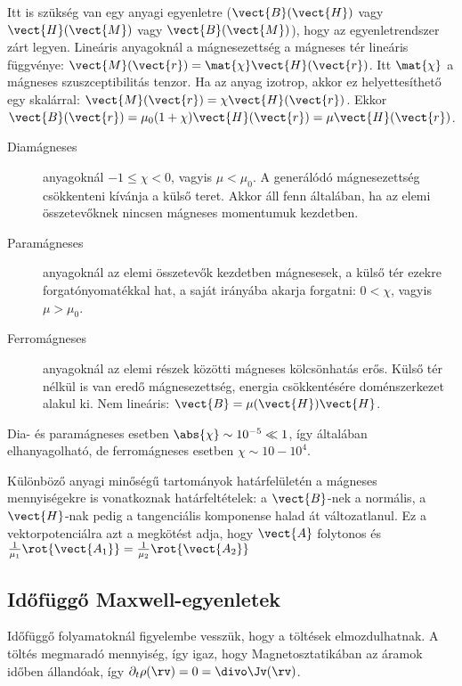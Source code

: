    Itt is szükség van egy anyagi egyenletre ($\vect{B}(\vect{H})$ vagy $\vect{H}(\vect{M})$ vagy $\vect{B}(\vect{M})$), hogy az egyenletrendszer zárt legyen.
   Lineáris anyagoknál a mágnesezettség a mágneses tér lineáris függvénye: $\vect{M}(\vect{r})=\mat{\chi}\vect{H}(\vect{r})$.
   Itt $\mat{\chi}$ a mágneses szuszceptibilitás tenzor.
   Ha az anyag izotrop, akkor ez helyettesíthető egy skalárral: $\vect{M}(\vect{r})=\chi\vect{H}(\vect{r})$.
   Ekkor $\vect{B}(\vect{r})=\mu_0(1+\chi)\vect{H}(\vect{r})=\mu\vect{H}(\vect{r})$. 
   
   \begin{description}
    \item[Diamágneses] anyagoknál $-1\leq\chi<0$, vagyis $\mu<\mu_0$.
   A generálódó mágnesezettség csökkenteni kívánja a külső teret.
   Akkor áll fenn általában, ha az elemi összetevőknek nincsen mágneses momentumuk kezdetben.
    \item[Paramágneses] anyagoknál az elemi összetevők kezdetben mágnesesek, a külső tér ezekre forgatónyomatékkal hat, a saját irányába akarja forgatni: $0<\chi$, vagyis $\mu>\mu_0$. 
    \item[Ferromágneses] anyagoknál az elemi részek közötti mágneses kölcsönhatás erős.
   Külső tér nélkül is van eredő mágnesezettség, energia csökkentésére doménszerkezet alakul ki.
   Nem lineáris: $\vect{B}=\mu(\vect{H})\vect{H}$. 
   \end{description}
   Dia- és paramágneses esetben $\abs{\chi}\sim 10^{-5}\ll 1$, így általában elhanyagolható, de ferromágneses esetben $\chi\sim 10-10^{4}$. 
   
   Különböző anyagi minőségű tartományok határfelületén a mágneses mennyiségekre is vonatkoznak határfeltételek: a $\vect{B}$-nek a normális, a $\vect{H}$-nak pedig a tangenciális komponense halad át változatlanul.
   Ez a vektorpotenciálra azt a megkötést adja, hogy $\vect{A}$ folytonos és $\frac{1}{\mu_1}\rot{\vect{A_1}}=\frac{1}{\mu_2}\rot{\vect{A_2}}$

  \subsection{Időfüggő Maxwell-egyenletek}
   
   Időfüggő folyamatoknál figyelembe vesszük, hogy a töltések elmozdulhatnak.
   A töltés megmaradó mennyiség, így igaz, hogy 
   Magnetosztatikában az áramok időben állandóak, így $\partial_t\rho(\rv)=0=\divo\Jv(\rv)$.
   
